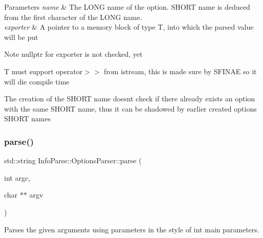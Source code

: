 \begin{DoxyParams}{Parameters}
{\em name}
    & The L\+O\+NG name of the option. S\+H\+O\+RT name is deduced from the first character of the L\+O\+NG name. \\
    \hline
    {\em exporter} & A pointer to a memory block of type T, into which the parsed value will be put\\
    \hline
\end{DoxyParams}
\begin{DoxyNote}{Note}
{\ttfamily nullptr}
    for exporter is not checked, yet

    T must support operator$>$$>$ from istream, this is made sure by S\+F\+I\+N\+AE so it will die compile time

    The creation of the S\+H\+O\+RT name doesn\textquotesingle{}t check if there already exists an option with the same S\+H\+O\+RT name, thus it can be shadowed by earlier created options\textquotesingle{} S\+H\+O\+RT names
\end{DoxyNote}
\mbox{\label{class_info_parse_1_1_options_parser_a9b6c22651efe911c4710ef0f27b71d44}}
\subsubsection{\texorpdfstring{parse()}{parse()}\hspace{0.1cm}{\footnotesize\ttfamily [1/2]}}
{\footnotesize\ttfamily std\+::string Info\+Parse\+::\+Options\+Parser\+::parse (\begin{DoxyParamCaption}
                                                                                     \item[{int}]{argc,  }\item[{char $\ast$$\ast$}]{argv }
\end{DoxyParamCaption})}



Parses the given arguments using parameters in the style of {\ttfamily int main} parameters.


